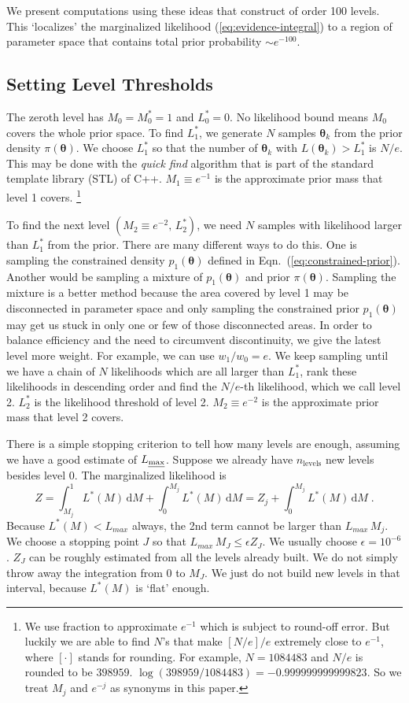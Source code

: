 \documentclass[letterpaper, preprint]{aastex}
\newcommand{\bth} {\boldsymbol \theta}
\begin{document}
We present computations using these ideas that construct of order 100 levels. This `localizes' the marginalized likelihood (\ref{eq:evidence-integral}) to a region of parameter space that contains total prior probability $\sim e^{-100}$.

\subsection{Setting Level Thresholds}
\label{sec:constructing}
The zeroth level has $M_0 = M^*_0 = 1$ and $L^*_0 = 0$. No likelihood bound means $M_0$ covers the whole prior space. To find $L^*_1$, we generate $N$ samples $\bth_k$ from the prior density $\pi(\bth)$. We choose $L^*_1$ so that the number of $\bth_k$ with $L(\bth_k) > L^*_1$ is $N/e$. This may be done with the {\em quick find} algorithm that is part of the standard template library (STL) of C++. $M_1\equiv e^{-1}$ is the approximate prior mass that level 1 covers. \footnote{We use fraction to approximate $e^{-1}$ which is subject to round-off error. But luckily we are able to find $N$'s that make $[N/e]/e$ extremely close to $e^{-1}$, where $[\cdot]$ stands for rounding. For example, $N=1084483$ and $N/e$ is rounded to be $398959$. $\log{(398959/1084483)}=-0.999999999999823$. So we treat $M_j$ and $e^{-j}$ as synonyms in this paper. } 

To find the next level $\left(M_2\equiv e^{-2}, \,L^*_2\right)$, we need $N$ samples with likelihood larger than $L^*_1$ from the prior. There are many different ways to do this. One is sampling the constrained density $p_{1}(\bth)$ defined in Eqn.~(\ref{eq:constrained-prior}). Another would be sampling a mixture of $p_{1}(\bth)$ and prior $\pi(\bth)$. Sampling the mixture is a better method because the area covered by level 1 may be disconnected in parameter space and only sampling the constrained prior $p_{1}(\bth)$ may get us stuck in only one or few of those disconnected areas. In order to balance efficiency and the need to circumvent discontinuity, we give the latest level more weight. For example, we can use $w_1/w_0=e$. We keep sampling until we have a chain of $N$ likelihoods which are all larger than $L^*_1$, rank these likelihoods in descending order and find the $N/e$-th likelihood, which we call level 2. $L_2^*$ is the likelihood threshold of level 2. $M_2\equiv e^{-2}$ is the approximate prior mass that level 2 covers. 

There is a simple stopping criterion to tell how many levels are enough, assuming we have a good estimate of $L_{\mbox{\scriptsize \em max}}$. Suppose we already have $n_{\mathrm{levels}}$ new levels besides level 0. The marginalized likelihood is 
$$
Z= \int_{M_{j}}^1 L^*(M)\,\mathrm{d}M+\int_0^{M_j} L^*(M)\,\mathrm{d}M=Z_j+\int_0^{M_j} L^*(M)\,\mathrm{d}M\; .
$$
Because $L^*(M) < L_{max}$ always, the 2nd term cannot be larger than $L_{max}\,M_j$. We choose a stopping point $J$ so that $L_{max}\,M_J \leq \epsilon Z_J$. We usually choose $\epsilon = 10^{-6}$. $Z_J$ can be roughly estimated from all the levels already built. We do not simply throw away the integration from $0$ to $M_J$. We just do not build new levels in that interval, because $L^*(M)$ is `flat' enough.
\end{document}
